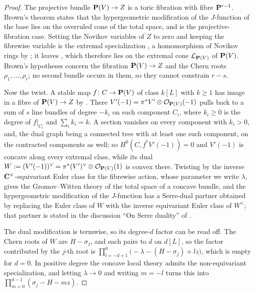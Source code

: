 \begin{proof}
  The projective bundle \(\mathbf P(V)\to Z\) is a toric fibration with fibre
  \(\mathbf P^{r-1}\).  Brown's theorem \cite[Theorem~1]{Brown} states that the
  hypergeometric modification of the \(J\)-function of the base lies on the
  overruled cone of the total space, and \cite[Corollary~1]{Brown} is the
  projective-fibration case.  Setting the Novikov variables of \(Z\) to zero
  and keeping the fibrewise variable is the extremal specialization
  \cite[(33)]{SS}, a homomorphism of Novikov rings by
  \cite[Proposition~4.1]{SS}; it leaves \cite[(34)]{SS}, which therefore
  lies on the extremal cone \(\mathcal L_{\mathbf P(V)}\) of \(\mathbf P(V)\).  Brown's
  hypotheses concern the fibration
  \(\mathbf P(V)\to Z\) and the Chern roots \(\rho_{1},\dots,\rho_{r}\); no second
  bundle occurs in them, so they cannot constrain \(r-s\).

  Now the twist.  A stable map \(f\colon C\to\mathbf P(V)\) of class \(k[L]\) with
  \(k\ge1\) has image in a fibre of \(\mathbf P(V)\to Z\) by \cite[Lemma~2.6]{SS}.
  There \(V'(-1)=\pi^{*}V'\otimes\mathcal O_{\mathbf P(V)}(-1)\) pulls back to a
  sum of \(s\) line bundles of degree \(-k_{i}\) on each component
  \(C_{i}\), where \(k_{i}\ge0\) is the degree of \(f|_{C_{i}}\) and
  \(\sum_{i}k_{i}=k\).  A section vanishes on every component with
  \(k_{i}>0\), and, the dual graph being a connected tree with at least one
  such component, on the contracted components as well; so
  \(H^{0}(C,f^{*}V'(-1))=0\) and
  \(V'(-1)\) is concave along every extremal class, while its dual
  \(W:=(V'(-1))^{\vee}=\pi^{*}(V')^{\vee}\otimes\mathcal O_{\mathbf P(V)}(1)\) is
  convex there.  Twisting by the inverse \(\mathbf C^{\times}\)-equivariant Euler
  class for the fibrewise action, whose parameter we write \(\lambda\),
  gives the Gromov--Witten theory of the total space of a concave bundle, and
  the hypergeometric modification \cite[Theorem~2]{CoatesGivental} of the
  \(J\)-function has a Serre-dual partner obtained by replacing the Euler
  class of \(W\) with the inverse equivariant Euler class of \(W^{\vee}\);
  that partner is stated in the discussion ``On Serre duality'' of
  \cite{CoatesGivental}.

  The dual modification is termwise, so its degree-\(d\) factor can be read
  off.  The Chern roots of \(W\) are \(H-\sigma_{j}\), and each pairs to
  \(d\) on \(d[L]\), so the factor contributed by the \(j\)-th root is
  \(\prod_{l=-d+1}^{0}\bigl(-\lambda-(H-\sigma_{j})+lz\bigr)\), which is
  empty for \(d=0\).  In positive degree the concave local theory admits the
  non-equivariant specialization, and letting \(\lambda\to0\) and writing
  \(m=-l\) turns this into
  \(\prod_{m=0}^{d-1}(\sigma_{j}-H-mz)\).


\end{proof}
